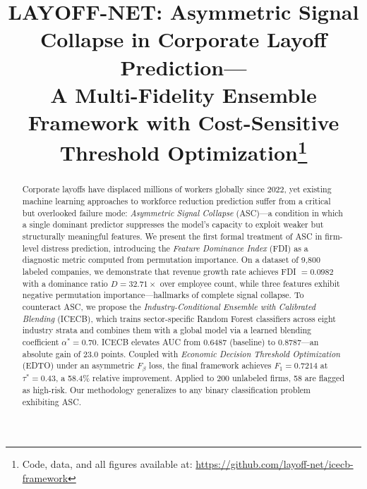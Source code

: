 \documentclass[conference]{IEEEtran}
\begin{document}
\title{LAYOFF-NET: Asymmetric Signal Collapse in Corporate Layoff Prediction---\\
A Multi-Fidelity Ensemble Framework with Cost-Sensitive Threshold Optimization\thanks{Code, data, and all figures available at: \url{https://github.com/layoff-net/icecb-framework}}}

\author{
\and
{}
}

\maketitle

\begin{abstract}
Corporate layoffs have displaced millions of workers globally since 2022, yet existing machine learning approaches to workforce reduction prediction suffer from a critical but overlooked failure mode: \textit{Asymmetric Signal Collapse} (ASC)---a condition in which a single dominant predictor suppresses the model's capacity to exploit weaker but structurally meaningful features. We present the first formal treatment of ASC in firm-level distress prediction, introducing the \textit{Feature Dominance Index} (FDI) as a diagnostic metric computed from permutation importance. On a dataset of 9,800 labeled companies, we demonstrate that revenue growth rate achieves FDI $= 0.0982$ with a dominance ratio $D = 32.71\times$ over employee count, while three features exhibit negative permutation importance---hallmarks of complete signal collapse. To counteract ASC, we propose the \textit{Industry-Conditional Ensemble with Calibrated Blending} (ICECB), which trains sector-specific Random Forest classifiers across eight industry strata and combines them with a global model via a learned blending coefficient $\alpha^* = 0.70$. ICECB elevates AUC from 0.6487 (baseline) to 0.8787---an absolute gain of 23.0 points. Coupled with \textit{Economic Decision Threshold Optimization} (EDTO) under an asymmetric $F_\beta$ loss, the final framework achieves $F_1 = 0.7214$ at $\tau^* = 0.43$, a 58.4\% relative improvement. Applied to 200 unlabeled firms, 58 are flagged as high-risk. Our methodology generalizes to any binary classification problem exhibiting ASC.
\end{abstract}
\end{document}
